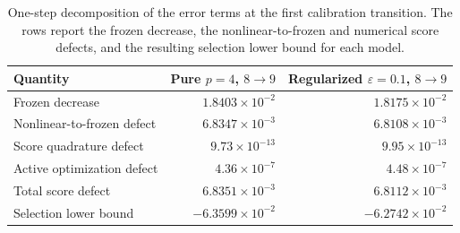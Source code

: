 \begin{table}[!htbp]
\centering
\scriptsize
\caption{One-step decomposition of the error terms at the first calibration transition. The rows report the frozen decrease, the nonlinear-to-frozen and numerical score defects, and the resulting selection lower bound for each model.}
\label{tab:transfer-margin-example}
\begin{tabularx}{\linewidth}{@{}Xrr@{}}
\toprule
Quantity & Pure \(p=4\), \(8\to9\) & Regularized \(\varepsilon=0.1\), \(8\to9\) \\
\midrule
Frozen decrease & \(1.8403\times10^{-2}\) & \(1.8175\times10^{-2}\) \\
Nonlinear-to-frozen defect & \(6.8347\times10^{-3}\) & \(6.8108\times10^{-3}\) \\
Score quadrature defect & \(9.73\times10^{-13}\) & \(9.95\times10^{-13}\) \\
Active optimization defect & \(4.36\times10^{-7}\) & \(4.48\times10^{-7}\) \\
Total score defect & \(6.8351\times10^{-3}\) & \(6.8112\times10^{-3}\) \\
Selection lower bound & \(-6.3599\times10^{-2}\) & \(-6.2742\times10^{-2}\) \\
\bottomrule
\end{tabularx}
\end{table}
